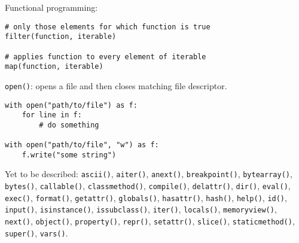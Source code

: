 Functional programming:
\begin{verbatim}
# only those elements for which function is true
filter(function, iterable)

# applies function to every element of iterable
map(function, iterable)
\end{verbatim}

\texttt{open()}: opens a file and then closes matching file descriptor.
\begin{verbatim}
with open("path/to/file") as f:
	for line in f:
		# do something

with open("path/to/file", "w") as f:
	f.write("some string")
\end{verbatim}

Yet to be described:
\texttt{ascii()},
\texttt{aiter()},
\texttt{anext()},
\texttt{breakpoint()},
\texttt{bytearray()},
\texttt{bytes()},
\texttt{callable()},
\texttt{classmethod()},
\texttt{compile()},
\texttt{delattr()},
\texttt{dir()},
\texttt{eval()},
\texttt{exec()},
\texttt{format()},
\texttt{getattr()},
\texttt{globals()},
\texttt{hasattr()},
\texttt{hash()},
\texttt{help()},
\texttt{id()},
\texttt{input()},
\texttt{isinstance()},
\texttt{issubclass()},
\texttt{iter()},
\texttt{locals()},
\texttt{memoryview()},
\texttt{next()},
\texttt{object()},
\texttt{property()},
\texttt{repr()},
\texttt{setattr()},
\texttt{slice()},
\texttt{staticmethod()},
\texttt{super()},
\texttt{vars()}.

%